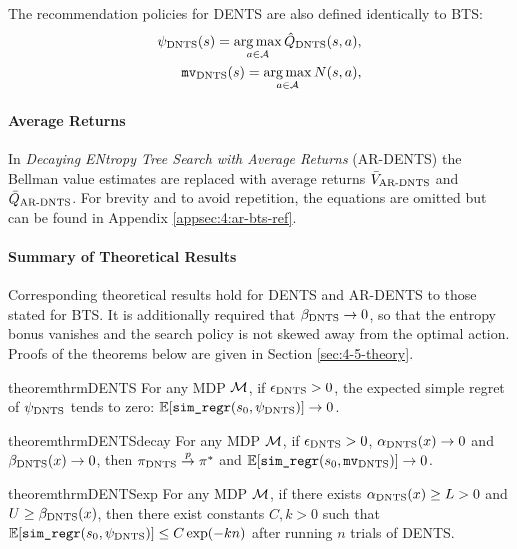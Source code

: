     The recommendation policies for DENTS are also defined identically to BTS:
    \begin{align}
        {\psi_{{\textnormal{DNTS}}}}(s) = \operatorname*{arg\,max}_{a\in\mathcal{A}}{\hat{Q}_{{\textnormal{DNTS}}}}(s,a), \label{eq:4:psidents} \\
        {\textup{\texttt{mv}}_{{\textnormal{DNTS}}}}(s) = \operatorname*{arg\,max}_{a\in\mathcal{A}} N(s,a), \label{eq:4:mvdents}
    \end{align}




    
    \paragraph{Average Returns}

    In \textit{Decaying ENtropy Tree Search with Average Returns} (AR-DENTS) the Bellman value estimates are replaced with average returns ${\bar{V}_{{\textnormal{AR-DNTS}}}}$ and ${\bar{Q}_{{\textnormal{AR-DNTS}}}}$. For brevity and to avoid repetition, the equations are omitted but can be found in Appendix \ref{appsec:4:ar-bts-ref}.
    






    \paragraph{Summary of Theoretical Results}

    Corresponding theoretical results hold for DENTS and AR-DENTS to those stated for BTS. It is additionally required that ${\beta_{{\textnormal{DNTS}}}}\rightarrow 0$, so that the entropy bonus vanishes and the search policy is not skewed away from the optimal action. Proofs of the theorems below are given in Section \ref{sec:4-5-theory}.

    \begin{restatable}{theorem}{thrmDENTS} \label{thrm:4:dents}
        For any MDP $\mathcal{M}$, if ${\epsilon_{{\textnormal{DNTS}}}} > 0$, the expected simple regret of ${\psi_{{\textnormal{DNTS}}}}$ tends to zero: $\mathbb{E}[{\textnormal{\texttt{sim\_regr}}}(s_0,{\psi_{{\textnormal{DNTS}}}})]\rightarrow 0$.
    \end{restatable}

    \begin{restatable}{theorem}{thrmDENTSdecay} \label{thrm:4:dents_decay}
        For any MDP $\mathcal{M}$, if ${\epsilon_{{\textnormal{DNTS}}}} > 0$, ${\alpha_{{\textnormal{DNTS}}}}(x)\rightarrow 0$ and ${\beta_{{\textnormal{DNTS}}}}(x)\rightarrow 0$, then ${\pi_{{\textnormal{DNTS}}}}\overset{p}{\to} \pi^*$ and $\mathbb{E}[{\textnormal{\texttt{sim\_regr}}}(s_0,{\textup{\texttt{mv}}_{{\textnormal{DNTS}}}})]\rightarrow 0$.
    \end{restatable}

    \begin{restatable}{theorem}{thrmDENTSexp} \label{thrm:4:dents_exp}
        For any MDP $\mathcal{M}$, if there exists ${\alpha_{{\textnormal{DNTS}}}}(x)\geq L > 0$ and $U\geq{\beta_{{\textnormal{DNTS}}}}(x)$, then there exist constants $C,k>0$ such that $\mathbb{E}[{\textnormal{\texttt{sim\_regr}}}(s_0,{\psi_{{\textnormal{DNTS}}}})] \leq C\exp(-kn)$ after running $n$ trials of DENTS.
    \end{restatable}
    
